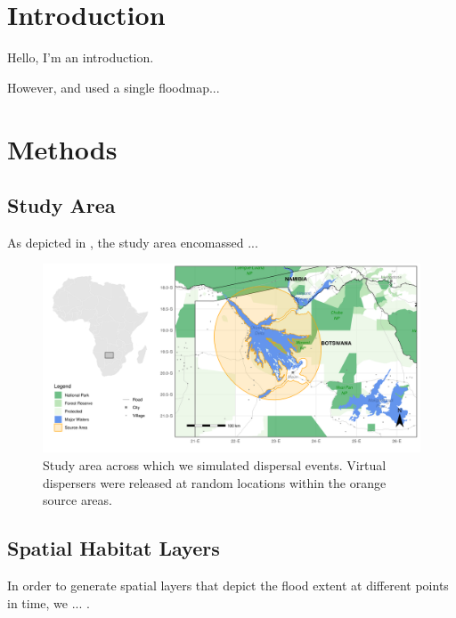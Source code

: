 \documentclass[abstract=on,10pt,a4paper,bibliography=totocnumbered]{article}
\begin{document}
\newpage

\onehalfspacing
\tableofcontents
\doublespacing

\newpage
{}


\section{Introduction}
Hello, I'm an introduction.

However, \cite{Hofmann.2021} and \cite{Hofmann.2022} used a single floodmap...

\section{Methods}

\subsection{Study Area}
As depicted in , the study area encomassed ...

\begin{figure}
  \begin{center}
  \includegraphics[width = \textwidth]{99_StudyArea.png}
  \caption{Study area across which we simulated dispersal events. Virtual
  dispersers were released at random locations within the orange source areas.}
  \label{StudyArea}
  \end{center}
\end{figure}

\subsection{Spatial Habitat Layers}
In order to generate spatial layers that depict the flood extent at different
points in time, we ... .
\end{document}
